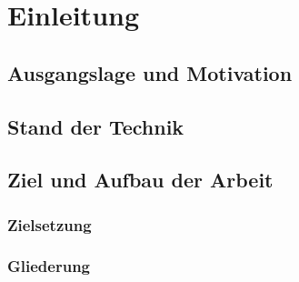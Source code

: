 \section{Einleitung}
\subsection{Ausgangslage und Motivation}

\subsection{Stand der Technik}
\subsection{ Ziel und Aufbau der Arbeit}
\subsubsection{Zielsetzung}
\subsubsection{Gliederung}
